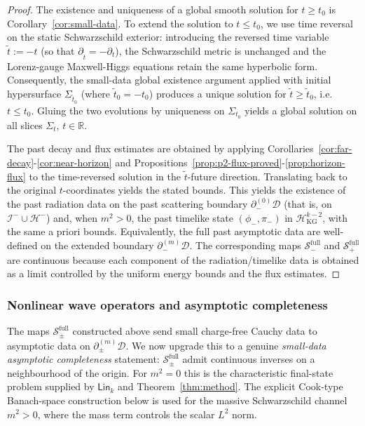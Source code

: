 \documentclass[11pt]{article}
\numberwithin{equation}{section}
\theoremstyle{plain}
\theoremstyle{definition}
\theoremstyle{remark}
\newcommand{\D}{\mathcal{D}}
\newcommand{\Lin}{\mathsf{Lin}}
\begin{document}
\begin{proof}
The existence and uniqueness of a global smooth solution for $t\ge t_0$ is Corollary~\ref{cor:small-data}.
To extend the solution to $t\le t_0$, we use time reversal on the static Schwarzschild exterior: introducing the reversed time variable $\tilde t:=-t$ (so that $\partial_{\tilde t}=-\partial_t$), the Schwarzschild metric is unchanged and the Lorenz-gauge Maxwell-Higgs equations retain the same hyperbolic form.
Consequently, the small-data global existence argument applied with initial hypersurface $\Sigma_{\tilde t_0}$ (where $\tilde t_0=-t_0$) produces a unique solution for $\tilde t\ge \tilde t_0$, i.e.\ $t\le t_0$.
Gluing the two evolutions by uniqueness on $\Sigma_{t_0}$ yields a global solution on all slices $\Sigma_t$, $t\in\mathbb R$.

The past decay and flux estimates are obtained by applying Corollaries~\ref{cor:far-decay}-\ref{cor:near-horizon} and Propositions~\ref{prop:p2-flux-proved}-\ref{prop:horizon-flux} to the time-reversed solution in the $\tilde t$-future direction. Translating back to the original $t$-coordinates yields the stated bounds.
This yields the existence of the past radiation data on the past scattering boundary $\partial_-^{(0)}\D$ (that is, on $\mathcal I^-\cup\mathcal H^-$) and, when $m^2>0$, the past timelike state $(\phi_-,\pi_-)$ in $\mathcal H_{\mathrm{KG}}^{k-2}$, with the same a priori bounds.
Equivalently, the full past asymptotic data are well-defined on the extended boundary $\partial_-^{(m)}\D$.
The corresponding maps $\mathscr S_-^{\mathrm{full}}$ and $\mathscr S_+^{\mathrm{full}}$ are continuous because each component of the radiation/timelike data is obtained as a limit controlled by the uniform energy bounds and the flux estimates.
\end{proof}


\subsubsection{Nonlinear wave operators and asymptotic completeness}
\label{subsec:wave-operators}
\label{subsubsec:wave-operators}

The maps $\mathscr S_{\pm}^{\mathrm{full}}$ constructed above send small charge-free Cauchy data to asymptotic data on $\partial_{\pm}^{(m)}\D$.
We now upgrade this to a genuine \emph{small-data asymptotic completeness} statement: $\mathscr S_{\pm}^{\mathrm{full}}$ admit continuous inverses on a neighbourhood of the origin.
For $m^{2}=0$ this is the characteristic final-state problem supplied by $\Lin_k$ and Theorem~\ref{thm:method}.  The explicit Cook-type Banach-space construction below is used for the massive Schwarzschild channel $m^{2}>0$, where the mass term controls the scalar $L^{2}$ norm.
\end{document}
